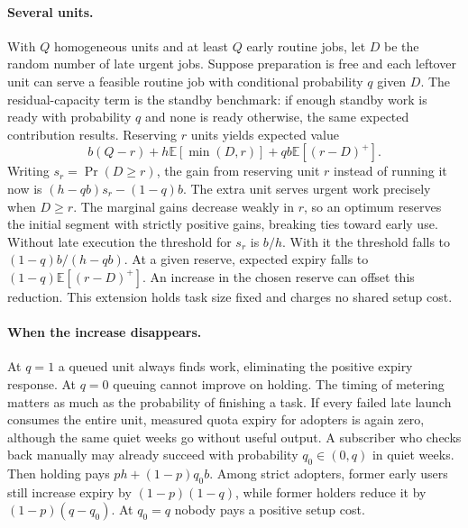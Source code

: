 \documentclass[11pt]{article}
\newcommand{\E}{\mathbb{E}}
\begin{document}
\paragraph{Several units.}
With $Q$ homogeneous units and at least $Q$ early routine jobs, let $D$ be the random number of late urgent jobs. Suppose preparation is free and each leftover unit can serve a feasible routine job with conditional probability $q$ given $D$. The residual-capacity term is the standby benchmark: if enough standby work is ready with probability $q$ and none is ready otherwise, the same expected contribution results. Reserving $r$ units yields expected value
\[
 b(Q-r)+h\E[\min(D,r)]+qb\E[(r-D)^+].
\]
Writing $s_r=\Pr(D\ge r)$, the gain from reserving unit $r$ instead of running it now is $(h-qb)s_r-(1-q)b$. The extra unit serves urgent work precisely when $D\ge r$. The marginal gains decrease weakly in $r$, so an optimum reserves the initial segment with strictly positive gains, breaking ties toward early use. Without late execution the threshold for $s_r$ is $b/h$. With it the threshold falls to $(1-q)b/(h-qb)$. At a given reserve, expected expiry falls to $(1-q)\E[(r-D)^+]$. An increase in the chosen reserve can offset this reduction. This extension holds task size fixed and charges no shared setup cost.

\paragraph{When the increase disappears.}
At $q=1$ a queued unit always finds work, eliminating the positive expiry response. At $q=0$ queuing cannot improve on holding. The timing of metering matters as much as the probability of finishing a task. If every failed late launch consumes the entire unit, measured quota expiry for adopters is again zero, although the same quiet weeks go without useful output. A subscriber who checks back manually may already succeed with probability $q_0\in(0,q)$ in quiet weeks. Then holding pays $ph+(1-p)q_0b$. Among strict adopters, former early users still increase expiry by $(1-p)(1-q)$, while former holders reduce it by $(1-p)(q-q_0)$. At $q_0=q$ nobody pays a positive setup cost.
\end{document}
